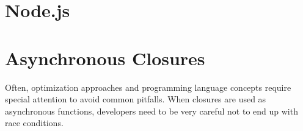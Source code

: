 








\section{Node.js}


\section{Asynchronous Closures}
%


Often, optimization approaches and programming language concepts require special attention to avoid common pitfalls.
When closures are used as asynchronous functions, developers need to be very careful not to end up with race conditions.


